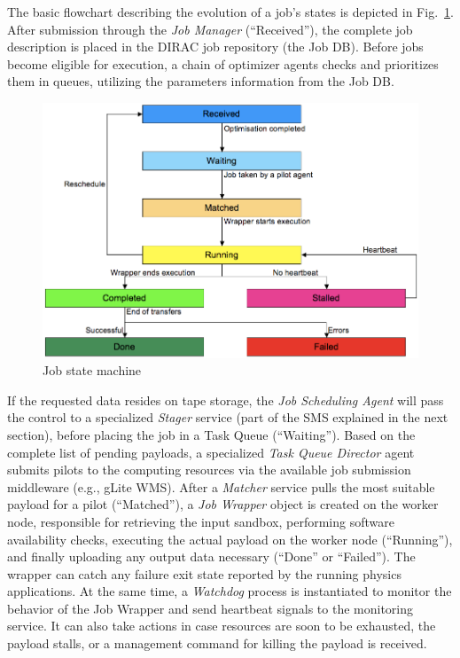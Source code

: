 \documentclass[10pt,conference]{IEEEtran}
\begin{document}
The basic flowchart describing the evolution of a job's states is depicted in
Fig.~\ref{fig:DIRAC-job-state-machine}. After submission through the \textit{Job Manager} (``Received''), the complete
job description is placed in the DIRAC job repository (the Job DB). Before jobs
become eligible for execution, a chain of optimizer agents checks and prioritizes
them in queues, utilizing the parameters information from the Job DB.
\begin{figure}[t]
\includegraphics[width=\linewidth,keepaspectratio=true]{./dirac-primary-states.png}
\centering
\caption{Job state machine \cite{ProductionShifterGuide}}
\vspace{-10 pt}
\label{fig:DIRAC-job-state-machine}
\end{figure} 
If the requested data resides on tape storage, the \textit{Job
Scheduling Agent} will pass the control to a specialized \textit{Stager} service (part of
the SMS explained in the next section), before placing the job in a Task Queue
(``Waiting''). Based on the complete list of pending payloads, a specialized \textit{Task
Queue Director} agent submits pilots to the computing resources via the available job
submission middleware (e.g., gLite WMS). After
a \textit{Matcher} service pulls the most suitable payload for a pilot (``Matched''), a \textit{Job
Wrapper} object is created on the worker node, responsible for retrieving the
input sandbox, performing software availability checks, executing the actual
payload on the worker node (``Running''), and finally uploading any output data
necessary (``Done'' or ``Failed''). The wrapper can catch any failure exit state
reported by the running physics applications. At the same time, a \textit{Watchdog}
process is instantiated to monitor the behavior of the Job Wrapper and send
heartbeat signals to the monitoring service. It can also take actions in case
resources are soon to be exhausted, the payload stalls, or a management command
for killing the payload is received.
\end{document}
